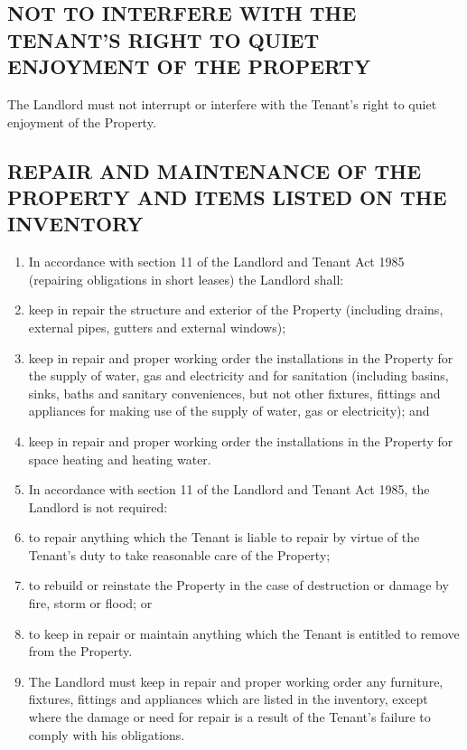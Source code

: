 \subsection{NOT TO INTERFERE WITH THE TENANT'S RIGHT TO QUIET ENJOYMENT OF THE PROPERTY}

{The Landlord must not interrupt or interfere with the Tenant's right to quiet enjoyment of the Property.}


\subsection{REPAIR AND MAINTENANCE OF THE PROPERTY AND ITEMS LISTED ON THE INVENTORY}
\begin{enumerate}
\item{In accordance with section 11 of the Landlord and Tenant Act 1985 (repairing obligations in short leases) the Landlord shall:}

\item{keep in repair the structure and exterior of the Property (including drains, external pipes, gutters and external windows);}
\item{keep in repair and proper working order the installations in the Property for the supply of water, gas and electricity and for sanitation (including basins, sinks, baths and sanitary conveniences, but not other fixtures, fittings and appliances for making use of the supply of water, gas or electricity); and}

\item{keep in repair and proper working order the installations in the Property for space heating and heating water.}
\item{In accordance with section 11 of the Landlord and Tenant Act 1985, the Landlord is not required:}
\item{to repair anything which the Tenant is liable to repair by virtue of the Tenant's duty to take reasonable care of the Property;}
\item{to rebuild or reinstate the Property in the case of destruction or damage by fire, storm or flood; or}
\item{to keep in repair or maintain anything which the Tenant is entitled to remove from the Property.}
\item{The Landlord must keep in repair and proper working order any furniture, fixtures, fittings and appliances which are listed in the inventory, except where the damage or need for repair is a result of the Tenant's failure to comply with his obligations.}

\end{enumerate}

